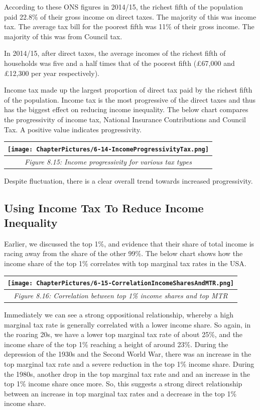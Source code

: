 \documentclass[]{tufte-handout}
\begin{document}
According to these ONS figures in 2014/15, the richest fifth of the
population paid 22.8\% of their gross income on direct taxes. The
majority of this was income tax. The average tax bill for the poorest
fifth was 11\% of their gross income. The majority of this was from
Council tax.

In 2014/15, after direct taxes, the average incomes of the richest fifth
of households was five and a half times that of the poorest fifth
(£67,000 and £12,300 per year respectively).

Income tax made up the largest proportion of direct tax paid by the
richest fifth of the population. Income tax is the most progressive of
the direct taxes and thus has the biggest effect on reducing income
inequality. The below chart compares the progressivity of income tax,
National Insurance Contributions and Council Tax. A positive value
indicates progressivity.

\begin{longtable}[]{@{}c@{}}
\toprule
\texttt{[image: ChapterPictures/6-14-IncomeProgressivityTax.png]}\tabularnewline
\midrule
\endhead
\emph{Figure 8.15: Income progressivity for various tax
types}\tabularnewline
\bottomrule
\end{longtable}

Despite fluctuation, there is a clear overall trend towards increased
progressivity.

\hypertarget{using-income-tax-to-reduce-income-inequality}{%
\subsection{Using Income Tax To Reduce Income
Inequality}\label{using-income-tax-to-reduce-income-inequality}}

Earlier, we discussed the top 1\%, and evidence that their share of
total income is racing away from the share of the other 99\%. The below
chart shows how the income share of the top 1\% correlates with top
marginal tax rates in the USA.

\begin{longtable}[]{@{}c@{}}
\toprule
\texttt{[image: ChapterPictures/6-15-CorrelationIncomeSharesAndMTR.png]}\tabularnewline
\midrule
\endhead
\emph{Figure 8.16: Correlation between top 1\% income shares and top
MTR}\tabularnewline
\bottomrule
\end{longtable}

Immediately we can see a strong oppositional relationship, whereby a
high marginal tax rate is generally correlated with a lower income
share. So again, in the roaring 20s, we have a lower top marginal tax
rate of about 25\%, and the income share of the top 1\% reaching a
height of around 23\%. During the depression of the 1930s and the Second
World War, there was an increase in the top marginal tax rate and a
severe reduction in the top 1\% income share. During the 1980s, another
drop in the top marginal tax rate and and an increase in the top 1\%
income share once more. So, this suggests a strong direct relationship
between an increase in top marginal tax rates and a decrease in the top
1\% income share.
\end{document}
